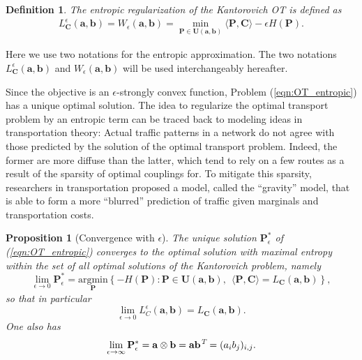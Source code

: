 \documentclass[11pt]{book}
\newtheorem{proposition}[theorem]{Proposition}
\newtheorem{definition}[theorem]{Definition}
\begin{document}
\begin{definition}
The entropic regularization of the Kantorovich OT is defined as
\begin{align}\label{eqn:OT_entropic}
L_{\mathbf{C}}^{\epsilon}(\mathbf{a}, \mathbf{b}) = W_{\epsilon}(\mathbf{a}, \mathbf{b}) = \min_{\mathbf{P} \in \mathbf{U}(\mathbf{a},\mathbf{b})} \langle \mathbf{P}, \mathbf{C} \rangle - \epsilon H(\mathbf{P}).
\end{align}
\end{definition}
Here we use two notations for the entropic approximation. The two notations $L_{\mathbf{C}}^{\epsilon}(\mathbf{a}, \mathbf{b})$ and $W_{\epsilon}(\mathbf{a}, \mathbf{b})$ will be used interchangeably hereafter.

Since the objective is an \(\epsilon\)-strongly convex function, Problem (\ref{eqn:OT_entropic}) has a unique optimal solution. The idea to regularize the optimal transport problem by an entropic term can be traced back to modeling ideas in transportation theory: Actual traffic patterns in a network do not agree with those predicted by the solution of the optimal transport problem. Indeed, the former are more diffuse than the latter, which tend to rely on a few routes as a result of the sparsity of optimal couplings for. To mitigate this sparsity, researchers in transportation proposed a model, called the ``gravity'' model, that is able to form a more ``blurred'' prediction of traffic given marginals and transportation costs.

\begin{proposition}[Convergence with \(\epsilon\)]
The unique solution \(\mathbf{P}_{\epsilon}^*\) of (\ref{eqn:OT_entropic}) converges to the optimal solution with maximal entropy within the set of all optimal solutions of the Kantorovich problem, namely
\begin{equation}
\lim_{\epsilon \to 0}\mathbf{P}^*_{\epsilon}  = \underset{ \mathbf{P}}{\mathrm{argmin}}  \left\{-H(\mathbf{P}) : \mathbf{P} \in \mathbf{U}(\mathbf{a},\mathbf{b}), \ \ \langle \mathbf{P}, \mathbf{C} \rangle = L_{\mathbf{C}}(\mathbf{a}, \mathbf{b})\right\},
\end{equation}
so that in particular
\begin{equation}
\lim_{\epsilon \to 0} L_{C}^{\epsilon}(\mathbf{a}, \mathbf{b}) = L_{\mathbf{C}}(\mathbf{a}, \mathbf{b}). 
\end{equation}
One also has
\begin{equation}
\lim_{\epsilon \to \infty}\mathbf{P}^*_{\epsilon} = \mathbf{a} \otimes \mathbf{b} = \mathbf{a}\mathbf{b}^{\emph{T}} = (a_i b_j)_{i,j}. 
\end{equation}
\end{proposition}
\end{document}
